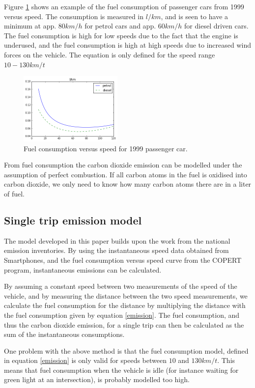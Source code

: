 \documentclass[conference]{IEEEtran}
\begin{document}
Figure \ref{FC} shows an example of the fuel consumption of passenger cars from 1999 versus speed. The consumption is measured in $l/km$, and is seen to have a minimum at app. $80 km/h$ for petrol cars and app. $60 km/h$ for diesel driven cars. The fuel consumption is high for low speeds due to the fact that the engine is underused, and the fuel consumption is high at high speeds due to increased wind forces on the vehicle. The equation is only defined for the speed range $10 - 130 km/t$
 
\begin{figure}[h]
	\centering
  \includegraphics[width=0.45\textwidth]{fc_dieselpetrol}
  \caption{Fuel consumption versus speed for 1999 passenger car.}
  \label{FC}
\end{figure}

From fuel consumption the carbon dioxide emission can be modelled under the assumption of perfect combustion. If all carbon atoms in the fuel is oxidised into carbon dioxide, we only need to know how many carbon atoms there are in a liter of fuel.

\subsection{Single trip emission model}
The model developed in this paper builds upon the work from the national emission inventories. By using the instantaneous speed data obtained from Smartphones, and the fuel consumption versus speed curve from the COPERT program, instantaneous emissions can be calculated.

By assuming a constant speed between two measurements of the speed of the vehicle, and by measuring the distance between the two speed measurements, we calculate the fuel consumption for the distance by multiplying the distance with the fuel consumption given by equation \ref{emission}. The fuel consumption, and thus the carbon dioxide emission, for a single trip can then be calculated as the sum of the instantaneous consumptions.

One problem with the above method is that the fuel consumption model, defined in equation \ref{emission} is only valid for speeds between $10$ and $130 km/t$. This means that fuel consumption when the vehicle is idle (for instance waiting for green light at an intersection), is probably modelled too high.
\end{document}
